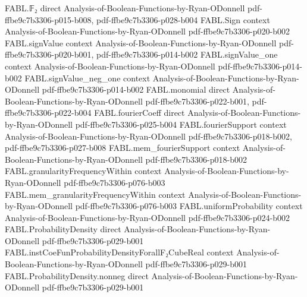 \begin{theorem}
\label{FABL.ProbabilityDensity.integral_toPMF_eq_expectation}
\leanok
{}
\proofstep
  {FABL.𝔽₂}
  {direct}
  {Analysis-of-Boolean-Functions-by-Ryan-ODonnell}
  {pdf-ffbe9c7b3306-p015-b008,
    pdf-ffbe9c7b3306-p028-b004}
\proofstep
  {FABL.Sign}
  {context}
  {Analysis-of-Boolean-Functions-by-Ryan-ODonnell}
  {pdf-ffbe9c7b3306-p020-b002}
\proofstep
  {FABL.signValue}
  {context}
  {Analysis-of-Boolean-Functions-by-Ryan-ODonnell}
  {pdf-ffbe9c7b3306-p020-b001,
    pdf-ffbe9c7b3306-p014-b002}
\proofstep
  {FABL.signValue_one}
  {context}
  {Analysis-of-Boolean-Functions-by-Ryan-ODonnell}
  {pdf-ffbe9c7b3306-p014-b002}
\proofstep
  {FABL.signValue_neg_one}
  {context}
  {Analysis-of-Boolean-Functions-by-Ryan-ODonnell}
  {pdf-ffbe9c7b3306-p014-b002}
\proofstep
  {FABL.monomial}
  {direct}
  {Analysis-of-Boolean-Functions-by-Ryan-ODonnell}
  {pdf-ffbe9c7b3306-p022-b001,
    pdf-ffbe9c7b3306-p022-b004}
\proofstep
  {FABL.fourierCoeff}
  {direct}
  {Analysis-of-Boolean-Functions-by-Ryan-ODonnell}
  {pdf-ffbe9c7b3306-p025-b004}
\proofstep
  {FABL.fourierSupport}
  {context}
  {Analysis-of-Boolean-Functions-by-Ryan-ODonnell}
  {pdf-ffbe9c7b3306-p018-b002,
    pdf-ffbe9c7b3306-p027-b008}
\proofstep
  {FABL.mem_fourierSupport}
  {context}
  {Analysis-of-Boolean-Functions-by-Ryan-ODonnell}
  {pdf-ffbe9c7b3306-p018-b002}
\proofstep
  {FABL.granularityFrequencyWithin}
  {context}
  {Analysis-of-Boolean-Functions-by-Ryan-ODonnell}
  {pdf-ffbe9c7b3306-p076-b003}
\proofstep
  {FABL.mem_granularityFrequencyWithin}
  {context}
  {Analysis-of-Boolean-Functions-by-Ryan-ODonnell}
  {pdf-ffbe9c7b3306-p076-b003}
\proofstep
  {FABL.uniformProbability}
  {context}
  {Analysis-of-Boolean-Functions-by-Ryan-ODonnell}
  {pdf-ffbe9c7b3306-p024-b002}
\proofstep
  {FABL.ProbabilityDensity}
  {direct}
  {Analysis-of-Boolean-Functions-by-Ryan-ODonnell}
  {pdf-ffbe9c7b3306-p029-b001}
\proofstep
  {FABL.instCoeFunProbabilityDensityForallF₂CubeReal}
  {context}
  {Analysis-of-Boolean-Functions-by-Ryan-ODonnell}
  {pdf-ffbe9c7b3306-p029-b001}
\proofstep
  {FABL.ProbabilityDensity.nonneg}
  {direct}
  {Analysis-of-Boolean-Functions-by-Ryan-ODonnell}
  {pdf-ffbe9c7b3306-p029-b001}

\end{theorem}
